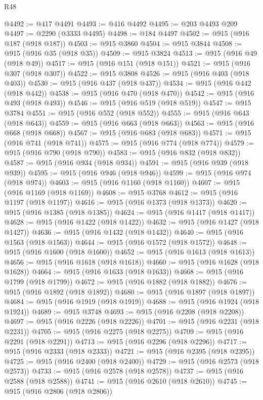 \begin{lexlean}{R48}
\begin{coremodule}
@4492 := @417 @4491
@4493 := @416 @4492
@4495 := @203 @4493 @209
@4497 := @2290 (@3333 @4495)
@4498 := @184 @4497
@4502 := @915 (@916 @187 (@918 @187))
@4503 := @915 @3860
@4504 := @915 @3844
@4508 := @915 (@916 @35 (@918 @35))
@4509 := @915 @3824
@4513 := @915 (@916 @49 (@918 @49))
@4517 := @915 (@916 @151 (@918 @151))
@4521 := @915 (@916 @307 (@918 @307))
@4522 := @915 @3808
@4526 := @915 (@916 @403 (@918 @403))
@4530 := @915 (@916 @437 (@918 @437))
@4534 := @915 (@916 @442 (@918 @442))
@4538 := @915 (@916 @470 (@918 @470))
@4542 := @915 (@916 @493 (@918 @493))
@4546 := @915 (@916 @519 (@918 @519))
@4547 := @915 @3784
@4551 := @915 (@916 @552 (@918 @552))
@4555 := @915 (@916 @643 (@918 @643))
@4559 := @915 (@916 @663 (@918 @663))
@4563 := @915 (@916 @668 (@918 @668))
@4567 := @915 (@916 @683 (@918 @683))
@4571 := @915 (@916 @741 (@918 @741))
@4575 := @915 (@916 @774 (@918 @774))
@4579 := @915 (@916 @790 (@918 @790))
@4583 := @915 (@916 @832 (@918 @832))
@4587 := @915 (@916 @934 (@918 @934))
@4591 := @915 (@916 @939 (@918 @939))
@4595 := @915 (@916 @946 (@918 @946))
@4599 := @915 (@916 @974 (@918 @974))
@4603 := @915 (@916 @1160 (@918 @1160))
@4607 := @915 (@916 @1169 (@918 @1169))
@4608 := @915 @3768
@4612 := @915 (@916 @1197 (@918 @1197))
@4616 := @915 (@916 @1373 (@918 @1373))
@4620 := @915 (@916 @1385 (@918 @1385))
@4624 := @915 (@916 @1417 (@918 @1417))
@4628 := @915 (@916 @1422 (@918 @1422))
@4632 := @915 (@916 @1427 (@918 @1427))
@4636 := @915 (@916 @1432 (@918 @1432))
@4640 := @915 (@916 @1563 (@918 @1563))
@4644 := @915 (@916 @1572 (@918 @1572))
@4648 := @915 (@916 @1600 (@918 @1600))
@4652 := @915 (@916 @1613 (@918 @1613))
@4656 := @915 (@916 @1618 (@918 @1618))
@4660 := @915 (@916 @1628 (@918 @1628))
@4664 := @915 (@916 @1633 (@918 @1633))
@4668 := @915 (@916 @1799 (@918 @1799))
@4672 := @915 (@916 @1882 (@918 @1882))
@4676 := @915 (@916 @1892 (@918 @1892))
@4680 := @915 (@916 @1897 (@918 @1897))
@4684 := @915 (@916 @1919 (@918 @1919))
@4688 := @915 (@916 @1924 (@918 @1924))
@4689 := @915 @3748
@4693 := @915 (@916 @2208 (@918 @2208))
@4697 := @915 (@916 @2226 (@918 @2226))
@4701 := @915 (@916 @2231 (@918 @2231))
@4705 := @915 (@916 @2275 (@918 @2275))
@4709 := @915 (@916 @2291 (@918 @2291))
@4713 := @915 (@916 @2296 (@918 @2296))
@4717 := @915 (@916 @2333 (@918 @2333))
@4721 := @915 (@916 @2395 (@918 @2395))
@4725 := @915 (@916 @2400 (@918 @2400))
@4729 := @915 (@916 @2573 (@918 @2573))
@4733 := @915 (@916 @2578 (@918 @2578))
@4737 := @915 (@916 @2588 (@918 @2588))
@4741 := @915 (@916 @2610 (@918 @2610))
@4745 := @915 (@916 @2806 (@918 @2806))

\end{coremodule}
\end{lexlean}
